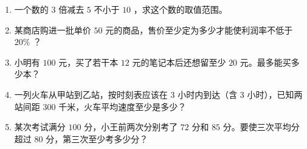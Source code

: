 \begin{practice}


\begin{enumerate}
  \item 一个数的 $3$ 倍减去 $5$ 不小于 $10$ ，求这个数的取值范围。
  \item 某商店购进一批单价 $50$ 元的商品，售价至少定为多少才能使利润率不低于 $20\%$ ？
  \item 小明有 $100$ 元，买了若干本 $12$ 元的笔记本后还想留至少 $20$ 元。最多能买多少本？
  \item 一列火车从甲站到乙站，按时刻表应该在 $3$ 小时内到达（含 $3$ 小时），已知两站间距 $300$ 千米，火车平均速度至少是多少？
  \item 某次考试满分 $100$ 分，小王前两次分别考了 $72$ 分和 $85$ 分。要使三次平均分超过 $80$ 分，第三次至少考多少分？
\end{enumerate}


\end{practice}



